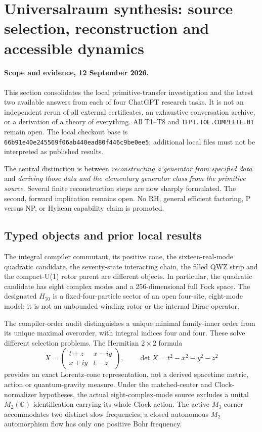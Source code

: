 \section{Universalraum synthesis: source selection, reconstruction and accessible dynamics}
\label{sec:universalraum-synthesis-20260912}

\paragraph{Scope and evidence, 12 September 2026.}
This section consolidates the local primitive-transfer investigation and
the latest two available answers from each of four ChatGPT research tasks.
It is not an independent rerun of all external certificates, an exhaustive
conversation archive, or a derivation of a theory of everything.
All T1--T8 and \texttt{TFPT.TOE.COMPLETE.01} remain open.
The local checkout base is
\texttt{66b91e40e245569f06ab440ead80f446c9be0ee5}; additional local files
must not be interpreted as published results.

The central distinction is between \emph{reconstructing a generator from
specified data} and \emph{deriving those data and the elementary generator
class from the primitive source}. Several finite reconstruction steps are
now sharply formulated. The second, forward implication remains open.
No RH, general efficient factoring, P versus NP, or Hyl\ae an capability
claim is promoted.

\subsection{Typed objects and prior local results}

The integral compiler commutant, its positive cone, the sixteen-real-mode
quadratic candidate, the seventy-state interacting chain, the filled QWZ
strip and the compact-U(1) rotor parent are different objects. In particular,
the quadratic candidate has eight complex modes and a 256-dimensional full
Fock space. The designated $H_{70}$ is a fixed-four-particle sector of an
open four-site, eight-mode model; it is not an unbounded winding rotor or
the internal Dirac operator.

The compiler-order audit distinguishes a unique minimal family-inner order
from its unique maximal overorder, with integral indices four and four.
These solve different selection problems. The Hermitian $2\times2$ formula
\[
 X=\begin{pmatrix}t+z&x-iy\\x+iy&t-z\end{pmatrix},\qquad
 \det X=t^2-x^2-y^2-z^2
\]
provides an exact Lorentz-cone representation, not a derived spacetime
metric, action or quantum-gravity measure. Under the matched-center and
Clock-normalizer hypotheses, the actual eight-complex-mode source excludes
a unital $M_2(\mathbb C)$ identification carrying its whole Clock action.
The active $M_3$ corner accommodates two distinct slow frequencies; a closed
autonomous $M_2$ automorphism flow has only one positive Bohr frequency.

